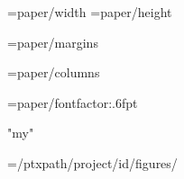 




\PaperWidth={paper/width}
\PaperHeight={paper/height}

\MarginUnit={paper/margins}
\def\TopMarginFactor{{1.15}}
\def\BottomMarginFactor{{1.15}}
\def\SideMarginFactor{{1.0}}

\BodyColumns={paper/columns}

\def\LineSpacingFactor{{{paragraph/linespacing}}}
\def\VerticalSpaceFactor{{1.0}}

\FontSizeUnit={paper/fontfactor:.6f}pt


\def\regular{{"{font/regular}"}}
\def\bold{{"{font/bold}"}}
\def\italic{{"{font/italic}"}}
\def\bolditalic{{"{font/bolditalic}"}}

\RTLfalse%
\XeTeXlinebreaklocale "my"
\JustifyParstrue



\def\HeaderPosition{{0.7}}
\def\FooterPosition{{0.7}}

\def\RHoddleft{{\empty}}
\def\RHoddcenter{{\rangeref}}
\def\RHoddright{{\pagenumber}}

\def\RHevenleft{{\empty}}
\def\RHevencenter{{\rangeref}}
\def\RHevenright{{\pagenumber}}

\VerseRefsfalse%

\def\RFoddcenter{{2019-09-04: DRAFT}}
\def\RFevencenter{{2019-09-04: DRAFT}}
\def\RFtitlecenter{{2019-09-04: DRAFT}}

\IncludeFigurestrue
\PicPath={{{/ptxpath}/{project/id}/figures/}}

